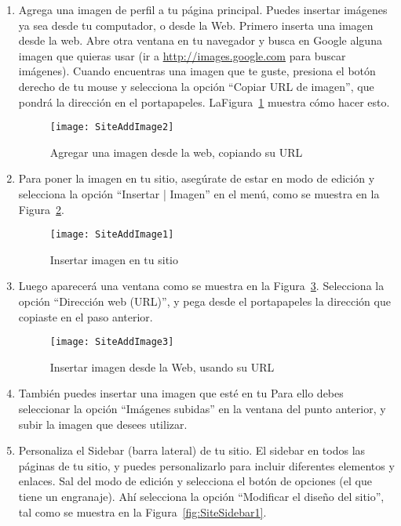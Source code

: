 \begin{enumerate}
\item Agrega una imagen de perfil a tu página principal. Puedes insertar imágenes ya sea desde tu computador, o desde la Web. Primero inserta una imagen desde la web. Abre otra ventana en tu navegador y busca en Google alguna imagen que quieras usar (ir a \url{http://images.google.com} para buscar imágenes). Cuando encuentras una imagen que te guste, presiona el botón derecho de tu mouse y selecciona la opción ``Copiar URL de imagen'', que pondrá la dirección en el portapapeles. LaFigura~\ref{fig:SiteAddImage2} muestra cómo hacer esto.

  \begin{figure}[H]
    \centering
    \texttt{[image: SiteAddImage2]}
    \caption{Agregar una imagen desde la web, copiando su URL}
    \label{fig:SiteAddImage2}
  \end{figure}

\item Para poner la imagen en tu sitio, asegúrate de estar en modo de edición y selecciona la opción ``Insertar | Imagen'' en el menú, como se muestra en la Figura~\ref{fig:SiteAddImage1}.

  \begin{figure}[H]
    \centering
    \texttt{[image: SiteAddImage1]}
    \caption{Insertar imagen en tu sitio}
    \label{fig:SiteAddImage1}
  \end{figure}

\item Luego aparecerá una ventana como se muestra en la Figura~\ref{fig:SiteAddImage3}. Selecciona la opción ``Dirección web (URL)'', y pega desde el portapapeles la dirección que copiaste en el paso anterior.

  \begin{figure}[H]
    \centering
    \texttt{[image: SiteAddImage3]}
    \caption{Insertar imagen desde la Web, usando su URL}
    \label{fig:SiteAddImage3}
  \end{figure}

\item También puedes insertar una imagen que esté en tu Para ello debes seleccionar la opción ``Imágenes subidas'' en la ventana del punto anterior, y subir la imagen que desees utilizar.

\item Personaliza el Sidebar (barra lateral) de tu sitio. El sidebar en todos las páginas de tu sitio, y puedes personalizarlo para incluir diferentes elementos y enlaces. Sal del modo de edición y selecciona el botón de opciones (el que tiene un engranaje). Ahí selecciona la opción ``Modificar el diseño del sitio'', tal como se muestra en la Figura~\ref{fig:SiteSidebar1}.


\end{enumerate}
